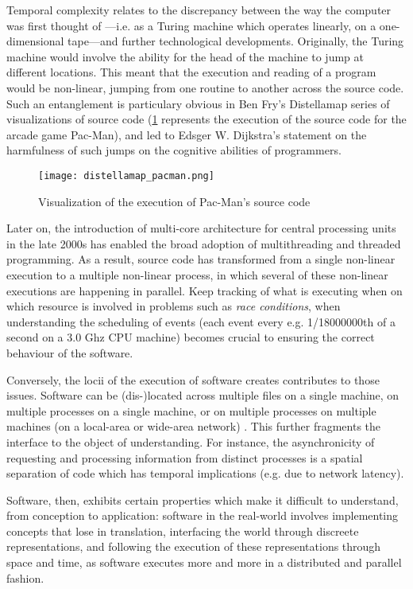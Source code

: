 Temporal complexity relates to the discrepancy between the way the computer was first thought of —i.e. as a Turing machine which operates linearly, on a one-dimensional tape—and further technological developments. Originally, the Turing machine would involve the ability for the head of the machine to jump at different locations. This meant that the execution and reading of a program would be non-linear, jumping from one routine to another across the source code. Such an entanglement is particulary obvious in Ben Fry's Distellamap series of visualizations of source code (\ref{graphic:pacman-visualization} represents the execution of the source code for the arcade game Pac-Man), and led to Edsger W. Dijkstra's statement on the harmfulness of such jumps on the cognitive abilities of programmers.


\begin{figure}
    \texttt{[image: distellamap\_pacman.png]}
    \caption{Visualization of the execution of Pac-Man's source code}
    \label{graphic:pacman-visualization}
\end{figure}

Later on, the introduction of multi-core architecture for central processing units in the late 2000s has enabled the broad adoption of multithreading and threaded programming. As a result, source code has transformed from a single non-linear execution to a multiple non-linear process, in which several of these non-linear executions are happening in parallel. Keep tracking of what is executing when on which resource is involved in problems such as \emph{race conditions}, when understanding the scheduling of events (each event every e.g. 1/18000000th of a second on a 3.0 Ghz CPU machine) becomes crucial to ensuring the correct behaviour of the software.

Conversely, the locii of the execution of software creates contributes to those issues. Software can be (dis-)located across multiple files on a single machine, on multiple processes on a single machine, or on multiple processes on multiple machines (on a local-area or wide-area network) \citep{berry_philosophy_2011}. This further fragments the interface to the object of understanding. For instance, the asynchronicity of requesting and processing information from distinct processes is a spatial separation of code which has temporal implications (e.g. due to network latency).

\spacer

Software, then, exhibits certain properties which make it difficult to understand, from conception to application: software in the real-world involves implementing concepts that lose in translation, interfacing the world through discreete representations, and following the execution of these representations through space and time, as software executes more and more in a distributed and parallel fashion.

